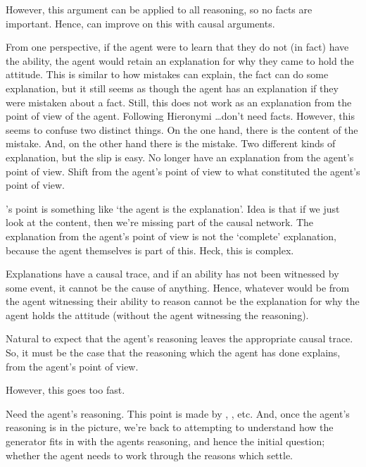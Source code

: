 \documentclass[10pt]{article}
\begin{document}
\newpage




\begin{note}
  However, this argument can be applied to all reasoning, so no facts are important.
  Hence, can improve on this with causal arguments.

  From one perspective, if the agent were to learn that they do not (in fact) have the ability, the agent would retain an explanation for why they came to hold the attitude.
  This is similar to how mistakes can explain, the fact can do some explanation, but it still seems as though the agent has an explanation if they were mistaken about a fact.
  Still, this does not work as an explanation from the point of view of the agent.
  Following Hieronymi \dots don't need facts.
  However, this seems to confuse two distinct things.
  On the one hand, there is the content of the mistake.
  And, on the other hand there is the mistake.
  Two different kinds of explanation, but the slip is easy.
  No longer have an explanation from the agent's point of view.
  Shift from the agent's point of view to what constituted the agent's point of view.

  \citeauthor{Hieronymi:2011aa}'s point is something like `the agent is the explanation'.
  {
    \color{red}
    Idea is that if we just look at the content, then we're missing part of the causal network.
    The explanation from the agent's point of view is not the `complete' explanation, because the agent themselves is part of this.
    Heck, this is complex.
  }

  Explanations have a causal trace, and if an ability has not been witnessed by some event, it cannot be the cause of anything.
  Hence, whatever would be from the agent witnessing their ability to reason cannot be the explanation for why the agent holds the attitude (without the agent witnessing the reasoning).

  Natural to expect that the agent's reasoning leaves the appropriate causal trace.
  So, it must be the case that the reasoning which the agent has done explains, from the agent's point of view.

  However, this goes too fast.

  Need the agent's reasoning.
  This point is made by \citeauthor[233]{Davidson:2001aa}, \citeauthor{Hieronymi:2018aa}, etc.
  And, once the agent's reasoning is in the picture, we're back to attempting to understand how the generator fits in with the agents reasoning, and hence the initial question; whether the agent needs to work through the reasons which settle.
\end{note}
\end{document}
